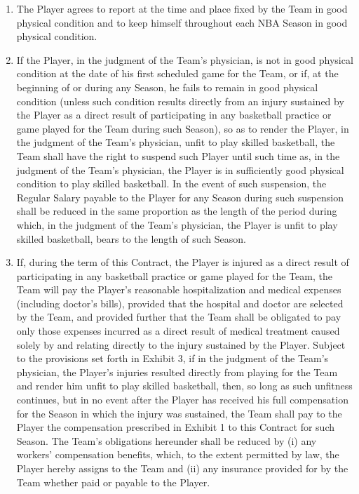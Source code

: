 \documentclass[
]{book}
\providecommand{\tightlist}{%
  \setlength{\itemsep}{0pt}\setlength{\parskip}{0pt}}
\begin{document}
\begin{enumerate}
  \begin{enumerate}
  \def\labelenumii{(\alph{enumii})}
  \tightlist
  \item
    The Player agrees to report at the time and place fixed by the Team in good physical condition and to keep himself throughout each NBA Season in good physical condition.
  \item
    If the Player, in the judgment of the Team's physician, is not in good physical condition at the date of his first scheduled game for the Team, or if, at the beginning of or during any Season, he fails to remain in good physical condition (unless such condition results directly from an injury sustained by the Player as a direct result of participating in any basketball practice or game played for the Team during such Season), so as to render the Player, in the judgment of the Team's physician, unfit to play skilled basketball, the Team shall have the right to suspend such Player until such time as, in the judgment of the Team's physician, the Player is in sufficiently good physical condition to play skilled basketball. In the event of such suspension, the Regular Salary payable to the Player for any Season during such suspension shall be reduced in the same proportion as the length of the period during which, in the judgment of the Team's physician, the Player is unfit to play skilled basketball, bears to the length of such Season.
  \item
    If, during the term of this Contract, the Player is injured as a direct result of participating in any basketball practice or game played for the Team, the Team will pay the Player's reasonable hospitalization and medical expenses (including doctor's bills), provided that the hospital and doctor are selected by the Team, and provided further that the Team shall be obligated to pay only those expenses incurred as a direct result of medical treatment caused solely by and relating directly to the injury sustained by the Player. Subject to the provisions set forth in Exhibit 3, if in the judgment of the Team's physician, the Player's injuries resulted directly from playing for the Team and render him unfit to play skilled basketball, then, so long as such unfitness continues, but in no event after the Player has received his full compensation for the Season in which the injury was sustained, the Team shall pay to the Player the compensation prescribed in Exhibit 1 to this Contract for such Season. The Team's obligations hereunder shall be reduced by (i) any workers' compensation benefits, which, to the extent permitted by law, the Player hereby assigns to the Team and (ii) any insurance provided for by the Team whether paid or payable to the Player.

\end{enumerate}
\end{enumerate}
\end{document}
